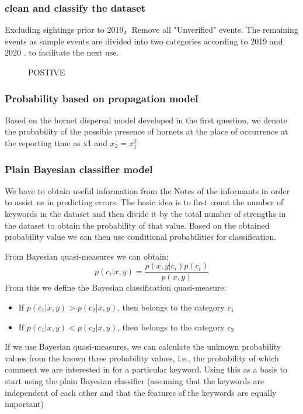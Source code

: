 \documentclass{mcmthesis}
\begin{document}
\subsubsection{clean and classify the dataset}
Excluding sightings prior to 2019，Remove all "Unverified" events. The remaining events as sample events are divided into two categories according to 2019 and 2020 . to facilitate the next use.

\begin{figure}[H]
\centering
{}
\caption{POSTIVE}
\label{POSTIVE}
\end{figure}

\subsubsection{Probability based on propagation model}

Based on the hornet dispersal model developed in the first question, we denote the probability of the possible presence of hornets at the place of occurrence at the reporting time as x1 and $x_2=x_1^2$

\subsubsection{ Plain Bayesian classifier model}
We have to obtain useful information from the Notes of the informants in order to assist us in predicting errors. The basic idea is to first count the number of keywords in the dataset and then divide it by the total number of strengths in the dataset to obtain the probability of that value. Based on the obtained probability value we can then use conditional probabilities for classification.

From Bayesian quasi-measures we can obtain:
$$p(c_i|x,y)=\frac{p(x,y|c_i)p(c_i)}{p(x,y)}$$
From this we define the Bayesian classification quasi-measure:
\begin{itemize}
    \item If $p(c_1|x,y) > p(c_2|x,y)$, then belongs to the category $c_1$
    \item If $p(c_1|x,y) < p(c_2|x,y)$, then belongs to the category $c_2$
\end{itemize}

If we use Bayesian quasi-measures, we can calculate the unknown probability values from the known three probability values, i.e., the probability of which comment we are interested in for a particular keyword.
Using this as a basis to start using the plain Bayesian classifier (assuming that the keywords are independent of each other and that the features of the keywords are equally important) 
\end{document}
